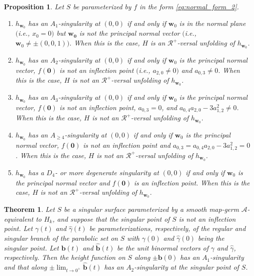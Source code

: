 \documentclass[10pt,a4paper]{amsart}
\newtheorem{proposition}{Proposition}
\newtheorem{theorem}{Theorem}
\renewcommand{\geq}{\geqslant}
\begin{document}
\begin{proposition}
\label{prop:height}
Let $S$ be parameterized by $f$ in the form \eqref{eq:normal_form_2}.
\begin{enumerate}
\item 
$h_{\bm{w}_0}$ has an $A_1$-singularity at $(0,0)$ if and only if $\bm{w}_0$ is in the normal plane $($i.e., $x_0 = 0)$ but $\bm{w_0}$ is not the principal normal vector $($i.e., $\bm{w}_0 \ne \pm(0,0,1))$.
When this is the case, $H$ is an $\mathcal{R}^+$-versal unfolding of $h_{\bm{w}_0}$. 

\item 
$h_{\bm{w}_0}$ has an $A_2$-singularity at $(0,0)$ if and only if $\bm{w}_0$ is the principal normal vector, $f(\bm{0})$ is not an inflection point $($i.e., $a_{2,0} \ne 0)$ and $a_{0,3} \ne 0$. 
When this is the case, $H$ is not an $\mathcal{R}^+$-versal unfolding of $h_{\bm{w}_0}$.

\item 
$h_{\bm{w}_0}$ has an $A_3$-singularity at $(0,0)$ if and only if $\bm{w}_0$ is the principal normal vector, $f(\bm{0})$ is not an inflection point, $a_{0,3} = 0$, and $a_{0,4} a_{2,0} - 3a_{1,2}^2 \ne 0$.
When this is the case, $H$ is not an $\mathcal{R}^+$-versal unfolding of $h_{\bm{w}_0}$.

\item 
$h_{\bm{w}_0}$ has an $A_{\geq 4}$-singularity at $(0,0)$ if and only if $\bm{w}_0$ is the principal normal vector, $f(\bm{0})$ is not an inflection point and $a_{0,3} = a_{0,4} a_{2,0} - 3 a_{1,2}^2 = 0$. 
When this is the case, $H$ is not an $\mathcal{R}^+$-versal unfolding of $h_{\bm{w}_0}$.

\item 
$h_{\bm{w}_0}$ has a $D_4$- or more degenerate singularity at $(0,0)$ if and only if $\bm{w}_0$ is the principal normal vector and $f(\bm{0})$ is an inflection point.
When this is the case, $H$ is not an $\mathcal{R}^+$-versal unfolding of $h_{\bm{w}_0}$.
\end{enumerate}
\end{proposition}

\begin{theorem}
\label{thm:branch}
Let $S$ be a singular surface parameterized by a smooth map-germ $\mathcal{A}$-equivalent to $H_k$, and suppose that the singular point of $S$ is not an inflection point. 
Let $\gamma(t)$ and $\hat\gamma(t)$ be parameterizations, respectively, of the regular and singular branch of the parabolic set on $S$ with $\gamma(0)$ and $\hat\gamma(0)$ being the singular point. 
Let $\bm{b}(t)$ and $\hat{\bm{b}}(t)$ be the unit binormal vectors of $\gamma$ and $\hat\gamma$, respectively. 
Then the height function on $S$ along $\pm\bm{b}(0)$ has an $A_1$-singularity and that along $\pm\lim_{t \to 0^+}\hat{\bm{b}}(t)$ has an $A_2$-singularity at the singular point of $S$.
\end{theorem}
\end{document}
